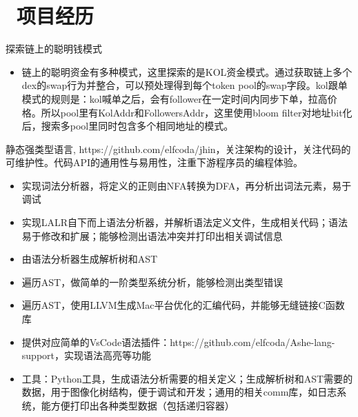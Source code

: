 \documentclass{resume}
\begin{document}
\section{\faCode\ 项目经历}

\begin{onehalfspacing}
探索链上的聪明钱模式
\begin{itemize}
  \item 链上的聪明资金有多种模式，这里探索的是KOL资金模式。通过获取链上多个dex的swap行为并整合，可以预处理得到每个token pool的swap字段。kol跟单模式的规则是：kol喊单之后，会有follower在一定时间内同步下单，拉高价格。所以pool里有KolAddr和FollowersAddr，这里使用bloom filter对地址bit化后，搜索多pool里同时包含多个相同地址的模式。
  \end{itemize}
\end{onehalfspacing}

\begin{onehalfspacing}
静态强类型语言, https://github.com/elfcoda/jhin，关注架构的设计，关注代码的可维护性。代码API的通用性与易用性，注重下游程序员的编程体验。
\begin{itemize}
  \item 实现词法分析器，将定义的正则由NFA转换为DFA，再分析出词法元素，易于调试
  \item 实现LALR自下而上语法分析器，并解析语法定义文件，生成相关代码；语法易于修改和扩展；能够检测出语法冲突并打印出相关调试信息
  \item 由语法分析器生成解析树和AST
  \item 遍历AST，做简单的一阶类型系统分析，能够检测出类型错误
  \item 遍历AST，使用LLVM生成Mac平台优化的汇编代码，并能够无缝链接C函数库
  \item 提供对应简单的VsCode语法插件：https://github.com/elfcoda/Ashe-lang-support，实现语法高亮等功能
  \item 工具：Python工具，生成语法分析需要的相关定义；生成解析树和AST需要的数据，用于图像化树结构，便于调试和开发；通用的相关comm库，如日志系统，能方便打印出各种类型数据（包括递归容器）
  \end{itemize}
\end{onehalfspacing}
\end{document}

